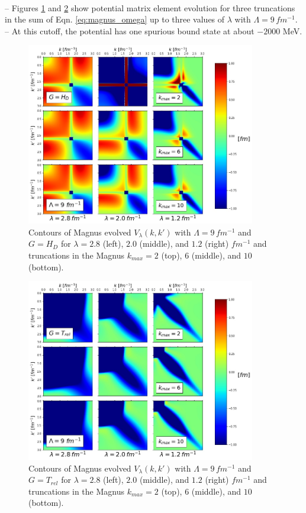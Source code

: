 \documentclass[preprintnumbers,floatfix,aps,prc,preprint,nofootinbib]{revtex4-1}
\begin{document}
\\
-- Figures \ref{fig:magnus_contours_Wendt_Lamb9_Wegner} and \ref{fig:magnus_contours_Wendt_Lamb9_T} show potential matrix element evolution for three truncations in the sum of Eqn. \ref{eq:magnus_omega} up to three values of $\lambda$ with $\Lambda=9 \, fm^{-1}$.
\\
-- At this cutoff, the potential has one spurious bound state at about $-2000$ MeV.
\\
%	
\begin{figure}
  \captionsetup{singlelinecheck=false,justification=raggedright}
  \centering
  \includegraphics[width=10cm]{magnus_contours_Wendt_Lamb9_Wegner}
  \hspace*{0.05\textwidth}
  \caption{Contours of Magnus evolved $V_{\lambda}(k,k')$ with $\Lambda=9 \, fm^{-1}$ and $G=H_{D}$ for $\lambda=2.8$ (left), $2.0$ (middle), and $1.2$ (right) $fm^{-1}$ and truncations in the Magnus $k_{max}=2$ (top), $6$ (middle), and $10$ (bottom).}
  \label{fig:magnus_contours_Wendt_Lamb9_Wegner}
\end{figure}
%
\begin{figure}
  \captionsetup{singlelinecheck=false,justification=raggedright}
  \centering
  \includegraphics[width=10cm]{magnus_contours_Wendt_Lamb9_T}
  \hspace*{0.05\textwidth}
  \caption{Contours of Magnus evolved $V_{\lambda}(k,k')$ with $\Lambda=9 \, fm^{-1}$ and $G=T_{rel}$ for $\lambda=2.8$ (left), $2.0$ (middle), and $1.2$ (right) $fm^{-1}$ and truncations in the Magnus $k_{max}=2$ (top), $6$ (middle), and $10$ (bottom).}
  \label{fig:magnus_contours_Wendt_Lamb9_T}
\end{figure}
\end{document}
